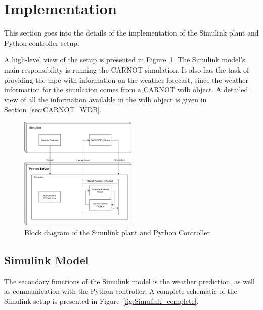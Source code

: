 \section{Implementation}\label{sec:implementation}

This section goes into the details of the implementation of the Simulink plant
and Python controller setup.

A high-level view of the setup is presented in Figure~\ref{fig:setup_diagram}.
The Simulink model's main responsibility is running the CARNOT simulation. It
also has the task of providing the \acrshort{mpc} with information on the
weather forecast, since the weather information for the simulation comes from a
CARNOT \acrshort{wdb} object. A detailed view of all the information available
in the \acrshort{wdb} object is given in Section~\ref{sec:CARNOT_WDB}.


\begin{figure}[ht]
    \centering
    \includegraphics[width = 0.5\textwidth]{Images/setup_diagram.pdf}
    \caption{Block diagram of the Simulink plant and Python Controller}
    \label{fig:setup_diagram}
\end{figure}

\subsection{Simulink Model}

The secondary functions of the Simulink model is the weather prediction, as well
as communication with the Python controller. A complete schematic of the
Simulink setup is presented in Figure~\ref{fig:Simulink_complete}.

